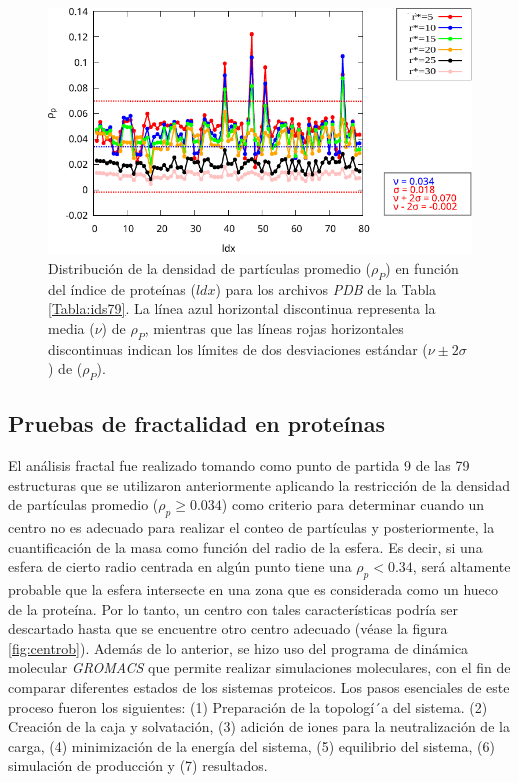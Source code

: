  	\begin{figure}[H]
 		\centering
 		\includegraphics[width=\linewidth]{graphs/dp-rn.pdf}
 		\caption{Distribución de la densidad de 
 			partículas promedio ($\rho_P$) en función del 
 			\'{i}ndice de prote\'{i}nas ($ldx$) para los 
 			archivos \emph{PDB} de la Tabla 
 			\ref{Tabla:ids79}. La línea azul horizontal 
 			discontinua representa la media ($\nu$) de   
 			$\rho_P$, mientras que las líneas rojas horizontales discontinuas indican los límites de dos desviaciones estándar (\(\nu \pm 2\sigma\)) de ($\rho_P$).}
 		\label{index-vs-density}
 	\end{figure}
 	
 	\color{black}
 	
	\subsection{Pruebas de fractalidad en proteínas}
	\label{sec:pfp}
 	
 	
 	El an\'{a}lisis fractal fue realizado tomando como punto de partida 9 de las 79 estructuras que se utilizaron anteriormente aplicando la restricci\'{o}n de la densidad de part\'{i}culas  promedio ($\rho_{p} \geq 0.034$) como criterio para determinar cuando un centro no es adecuado para realizar el conteo de part\'{i}culas y posteriormente, la cuantificaci\'{o}n de la masa como funci\'{o}n del radio de la esfera. Es decir, si una esfera de cierto radio centrada en alg\'{u}n punto tiene una $\rho_{p} < 0.34$, ser\'{a} altamente probable que la esfera intersecte en una zona que es considerada como un hueco de la prote\'{i}na. Por lo tanto, un centro con tales caracter\'{i}sticas podr\'{i}a ser descartado hasta que se encuentre otro centro adecuado (v\'{e}ase la figura \ref{fig:centrob}). Adem\'{a}s de lo anterior, se hizo uso del programa de din\'{a}mica molecular \textit{GROMACS}\cite{Lemkul2024, Abraham2015} que permite realizar simulaciones moleculares, con el fin de comparar diferentes estados de los sistemas proteicos. Los pasos esenciales de este proceso fueron los siguientes: (1) Preparaci\'{o}n de la topolog\'{i´}a del sistema. (2) Creaci\'{o}n de la caja y solvataci\'{o}n, (3) adici\'{o}n de iones para la neutralizaci\'{o}n de la carga, (4) minimizaci\'{o}n de la energ\'{i}a del sistema, (5) equilibrio del sistema, (6) simulaci\'{o}n de producci\'{o}n y (7) resultados.
 	
